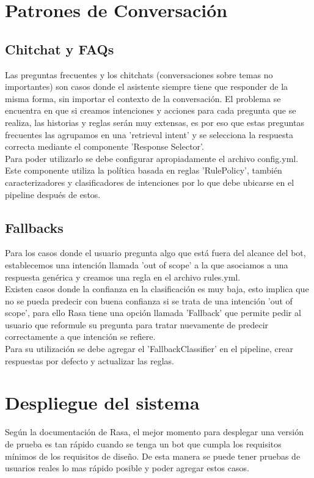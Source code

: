 \section{Patrones de Conversación}
\subsection{Chitchat y FAQs}
Las preguntas frecuentes y los chitchats (conversaciones sobre temas no importantes) son casos
donde el asistente siempre tiene que responder de la misma forma, sin importar el contexto de la
conversación. El problema se encuentra en que si creamos intenciones y acciones para cada pregunta
que se realiza, las historias y reglas serán muy extensas, es por eso que estas preguntas
frecuentes las agrupamos en una 'retrieval intent' y se selecciona la respuesta correcta mediante
el componente 'Response Selector'.\\
Para poder utilizarlo se debe configurar apropiadamente el archivo config.yml. Este componente
utiliza la política basada en reglas 'RulePolicy', también caracterizadores y clasificadores de
intenciones por lo que debe ubicarse en el pipeline después de estos.
\subsection{Fallbacks}
Para los casos donde el usuario pregunta algo que está fuera del alcance del bot, establecemos una
intención llamada 'out of scope' a la que asociamos a una respuesta genérica y creamos una regla en
el archivo rules.yml.\\ Existen casos donde la confianza en la clasificación es muy baja, esto
implica que no se pueda predecir con buena confianza si se trata de una intención 'out of scope',
para ello Rasa tiene una opción llamada 'Fallback' que permite pedir al usuario que reformule su
pregunta para tratar nuevamente de predecir correctamente a que intención se refiere. \\
Para su utilización se debe agregar el 'FallbackClassifier' en el pipeline, crear respuestas por
defecto y actualizar las reglas.

\section{Despliegue del sistema}
Según la documentación de Rasa, el mejor momento para desplegar una versión de prueba es tan rápido
cuando
se tenga un bot que cumpla los requisitos mínimos de los requisitos de diseño. De esta manera se
puede
tener pruebas de usuarios reales lo mas rápido posible y poder agregar estos casos.
